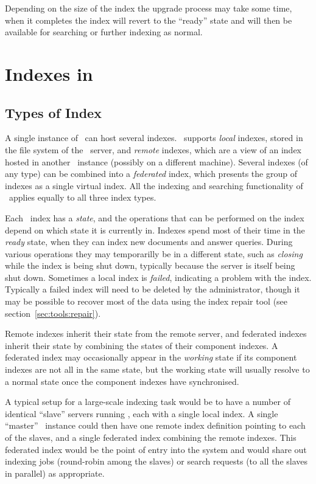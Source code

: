 Depending on the size of the index the upgrade process may take some time, when
it completes the index will revert to the ``ready'' state and will then be
available for searching or further indexing as normal.

\section{Indexes in \Mimir}

\subsection{Types of Index}\label{sec:admin:index-types}

A single instance of \Mimir\ can host several indexes.  \Mimir\ supports
{\em local} indexes, stored in the file system of the \Mimir\ server, and
{\em remote} indexes, which are a view of an index hosted in another \Mimir\
instance (possibly on a different machine).  Several indexes (of any type) can
be combined into a {\em federated} index, which presents the group of indexes as
a single virtual index.  All the indexing and searching functionality of
\Mimir\ applies equally to all three index types.

Each \Mimir\ index has a {\em state}, and the operations that can be performed
on the index depend on which state it is currently in. Indexes spend most of
their time in the {\em ready} state, when they can index new documents and
answer queries. During various operations they may temporarilly be in a
different state, such as {\em closing} while the index is being shut down,
typically because the \Mimir{} server is itself being shut down. Sometimes a
local index is {\em failed}, indicating a problem with the index.  Typically a
failed index will need to be deleted by the administrator, though it may be
possible to recover most of the data using the index repair tool (see
section~\ref{sec:tools:repair}).

Remote indexes inherit their state from the remote server, and federated indexes
inherit their state by combining the states of their component indexes.
A federated index may occasionally appear in the {\em working} state if its
component indexes are not all in the same state, but the working state will
usually resolve to a normal state once the component indexes have synchronised.


A typical setup for a large-scale indexing task would be to have a number of
identical ``slave'' servers running \Mimir, each with a single local index.  A
single ``master'' \Mimir\ instance could then have one remote index definition
pointing to each of the slaves, and a single federated index combining the
remote indexes.  This federated index would be the point of entry into the
system and would share out indexing jobs (round-robin among the slaves) or
search requests (to all the slaves in parallel) as appropriate.

